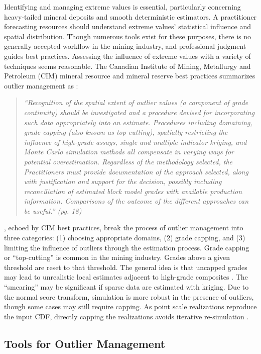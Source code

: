 Identifying and managing extreme values is essential, particularly concerning heavy-tailed mineral deposits and smooth deterministic estimators. A practitioner forecasting resources should understand extreme values' statistical influence and spatial distribution. Though numerous tools exist for these purposes, there is no generally accepted workflow in the mining industry, and professional judgment guides best practices. Assessing the influence of extreme values with a variety of techniques seems reasonable. The Canadian Institute of Mining, Metallurgy and Petroleum (CIM) mineral resource and mineral reserve best practices summarizes outlier management as \citep{cim2019}:

\blockquote{\textit{``Recognition of the spatial extent of outlier values (a component of grade continuity) should be investigated and a procedure devised for incorporating such data appropriately into an estimate. Procedures including domaining, grade capping (also known as top cutting), spatially restricting the influence of high-grade assays, single and multiple indicator kriging, and Monte Carlo simulation methods all compensate in varying ways for potential overestimation. Regardless of the methodology selected, the Practitioners must provide documentation of the approach selected, along with justification and support for the decision, possibly including reconciliation of estimated block model grades with available production information. Comparisons of the outcome of the different approaches can be useful.'' (pg. 18)}}

\cite{leuangthong2015dealing}, echoed by CIM best practices, break the process of outlier management into three categories: (1) choosing appropriate domains, (2) grade capping, and (3) limiting the influence of outliers through the estimation process. Grade capping or ``top-cutting'' is common in the mining industry. Grades above a given threshold are reset to that threshold. The general idea is that uncapped grades may lead to unrealistic local estimates adjacent to high-grade composites \citep{nowak2013suggestions}. The ``smearing'' may be significant if sparse data are estimated with kriging. Due to the normal score transform, simulation is more robust in the presence of outliers, though some cases may still require capping. As point scale realizations reproduce the input \gls{CDF}, directly capping the realizations avoids iterative re-simulation \citep{harding2023probabilistic}.

\FloatBarrier
\subsection{Tools for Outlier Management}
\label{subsec:02tools}

